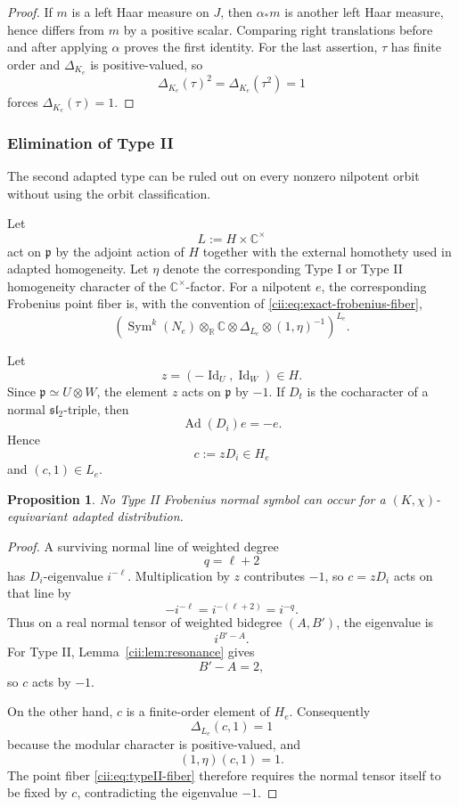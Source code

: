 \documentclass[10pt,a4paper]{amsart}
\numberwithin{equation}{section}
\newtheorem{proposition}[theorem]{Proposition}
\newcommand{\C}{\mathbb C}
\newcommand{\R}{\mathbb R}
\newcommand{\Sym}{\operatorname{Sym}}
\newcommand{\Ad}{\operatorname{Ad}}
\newcommand{\Id}{\operatorname{Id}}
\begin{document}
\begin{proof}
If \(m\) is a left Haar measure on \(J\), then \(\alpha_*m\) is another
left Haar measure, hence differs from \(m\) by a positive scalar.
Comparing right translations before and after applying \(\alpha\) proves
the first identity.  For the last assertion, \(\tau\) has finite order
and \(\Delta_{K_e}\) is positive-valued, so
\[
\Delta_{K_e}(\tau)^2=\Delta_{K_e}(\tau^2)=1
\]
forces \(\Delta_{K_e}(\tau)=1\).
\end{proof}


\subsubsection{Elimination of Type II}

The second adapted type can be ruled out on every nonzero nilpotent orbit
without using the orbit classification.

Let
\[
L:=H\times\C^\times
\]
act on \(\mathfrak p\) by the adjoint action of \(H\) together with the
external homothety used in adapted homogeneity.  Let \(\eta\) denote the
corresponding Type I or Type II homogeneity character of the
\(\C^\times\)-factor.  For a nilpotent \(e\), the corresponding Frobenius point fiber is,
with the convention of
\eqref{cii:eq:exact-frobenius-fiber},
\begin{equation}\label{cii:eq:typeII-fiber}
\left(
\Sym^k(N_e)\otimes_{\R}\C
\otimes\Delta_{L_e}
\otimes(1,\eta)^{-1}
\right)^{L_e}.
\end{equation}

Let
\[
z=(-\Id_U,\Id_W)\in H.
\]
Since \(\mathfrak p\simeq U\otimes W\), the element \(z\) acts on
\(\mathfrak p\) by \(-1\).  If \(D_t\) is the cocharacter of a normal
\(\mathfrak{sl}_2\)-triple, then
\[
\Ad(D_i)e=-e.
\]
Hence
\[
c:=zD_i\in H_e
\]
and \((c,1)\in L_e\).

\begin{proposition}\label{cii:prop:typeII}
No Type II Frobenius normal symbol can occur for a
\((K,\chi)\)-equivariant adapted distribution.
\end{proposition}

\begin{proof}
A surviving normal line of weighted degree
\[
q=\ell+2
\]
has \(D_i\)-eigenvalue \(i^{-\ell}\).  Multiplication by \(z\) contributes
\(-1\), so \(c=zD_i\) acts on that line by
\[
-i^{-\ell}=i^{-(\ell+2)}=i^{-q}.
\]
Thus on a real normal tensor of weighted bidegree \((A,B')\), the
eigenvalue is
\[
i^{B'-A}.
\]
For Type II, Lemma~\ref{cii:lem:resonance} gives
\[
B'-A=2,
\]
so \(c\) acts by \(-1\).

On the other hand, \(c\) is a finite-order element of \(H_e\).
Consequently
\[
\Delta_{L_e}(c,1)=1
\]
because the modular character is positive-valued, and
\[
(1,\eta)(c,1)=1.
\]
The point fiber \eqref{cii:eq:typeII-fiber} therefore requires the normal tensor itself to be
fixed by \(c\), contradicting the eigenvalue \(-1\).
\end{proof}
\end{document}

